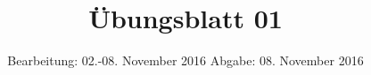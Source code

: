 


\subject{SMD}
\title{Übungsblatt 01}
\date{
  Bearbeitung: 02.-08. November 2016
  \newline
  Abgabe: 08. November 2016
}




\maketitle







